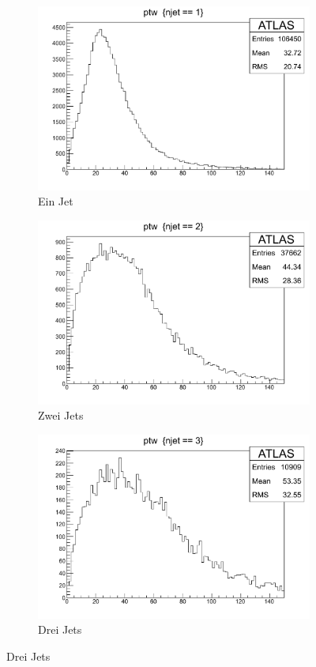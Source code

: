 \documentclass[11pt, a4paper]{article}
\numberwithin{equation}{section}
\begin{document}
\begin{figure}
	\centering
	\begin{subfigure}{.49\textwidth}
		\centering
		\includegraphics[width=.7\textwidth]{./data/root/wmass/exercise2/njet1.pdf}
		\caption{Ein Jet}
	\end{subfigure}
	\begin{subfigure}{.49\textwidth}
		\centering
		\includegraphics[width=.7\textwidth]{./data/root/wmass/exercise2/njet2.pdf}
		\caption{Zwei Jets}
	\end{subfigure}
	\begin{subfigure}{.49\textwidth}
		\centering
		\includegraphics[width=.7\textwidth]{./data/root/wmass/exercise2/njet3.pdf}
		\caption{Drei Jets}

\end{subfigure}
\end{figure}
\end{document}

